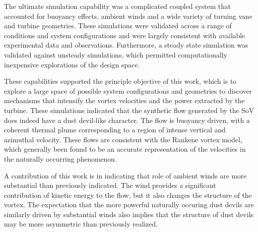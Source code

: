 The ultimate simulation capability was a complicated coupled system that
accounted for buoyancy effects, ambient winds and a wide variety of
turning vane and turbine geometries. These simulations were validated
across a range of conditions and system configurations and were largely
consistent with available experimental data and
observations. Furthermore, a steady state simulation was validated
against unsteady simulations, which permitted computationally
inexpensive explorations of the design space. 




These capabilities supported the principle objective of this work, which
is to explore a large space of possible system configurations and
geometries to discover mechanisms that intensify the vortex velocities
and the power extracted by the turbine. These simulations indicated that
the synthetic flow generated by the SoV does indeed have a dust
devil-like character. The flow is buoyancy driven, with a coherent
thermal plume corresponding to a region of intense vertical and
azimuthal velocity. These flows are consistent with the Rankene
vortex model, which generally been found to be an accurate
representation of the velocities in the naturally occurring phenomenon. 

A contribution of this work is in indicating that role of
ambient winds are more substantial than previously indicated. The wind
provides a significant contribution of kinetic energy to the flow, but it
also changes the structure of the vortex. The expectation that the more
powerful naturally occuring dust devils are similarly driven by substantial 
winds also implies that the structure of dust devils may be more 
asymmetric than previously realized. 


